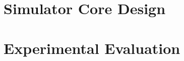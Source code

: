 \documentclass[conference, 10pt]{IEEEtran}
\begin{document}
\section{Simulator Core Design}
\label{sec:core-design}


\section{Experimental Evaluation}
\end{document}
